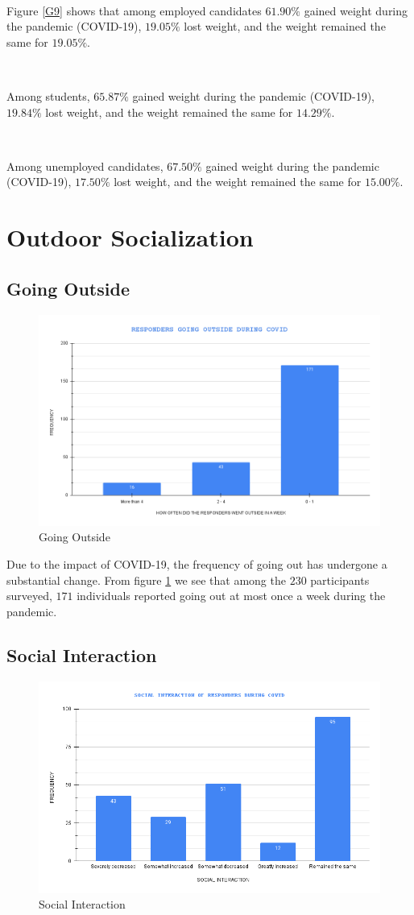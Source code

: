 \ 

Figure \ref{G9} shows that among employed candidates $61.90\%$ gained weight during the pandemic (COVID-19), $19.05\%$ lost weight, and the weight remained the same for $19.05\%$.

\ 

Among students, $65.87\%$ gained weight during the pandemic (COVID-19), $19.84\%$ lost weight, and the weight remained the same for $14.29\%$.

\ 

Among unemployed candidates, $67.50\%$ gained weight during the pandemic (COVID-19), $17.50\%$ lost weight, and the weight remained the same for $15.00\%$.


\newpage

\section{Outdoor Socialization}

\subsection{Going Outside}

\begin{figure}[h!]
	\centering
	\includegraphics[width=0.6\linewidth]{IMAGES/Image 22.png}
	\caption{Going Outside}
	\label{G22}
\end{figure}

Due to the impact of COVID-19, the frequency of going out has undergone a substantial change. From figure \ref{G22} we see that among the $230$ participants surveyed, $171$ individuals reported going out at most once a week during the pandemic.

\subsection{Social Interaction}

\begin{figure}[h!]
	\centering
	\includegraphics[width=0.6\linewidth]{IMAGES/Image 23.png}
	\caption{Social Interaction}
	\label{G23}
\end{figure}

